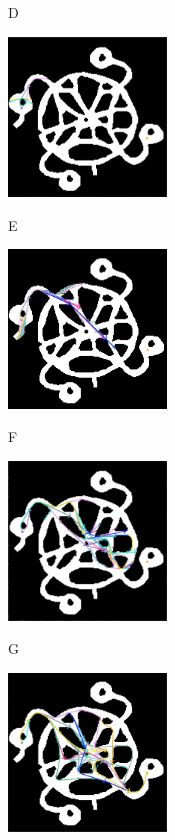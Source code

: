 \documentclass[letterpaper, 10 pt, journal, twoside]{IEEEtran}
\begin{document}
\begin{figure}[t]
\begin{minipage}{.23\linewidth}
  \centerline{D}
\end{minipage}
\vfill
\begin{minipage}{.23\linewidth}
  \centerline{\includegraphics[width=4.2cm, cframe=gray .2mm]{map4.png}}
  \centerline{E}
\end{minipage}
\hfill
\begin{minipage}{.23\linewidth}
  \centerline{\includegraphics[width=4.2cm, cframe=gray .2mm]{map5.png}}
  \centerline{F}
\end{minipage}
\hfill
\begin{minipage}{.23\linewidth}
  \centerline{\includegraphics[width=4.2cm, cframe=gray .2mm]{map6.png}}
  \centerline{G}
\end{minipage}
\hfill
\begin{minipage}{.23\linewidth}
  \centerline{\includegraphics[width=4.2cm, cframe=gray .2mm]{map7.png}}

\end{minipage}
\end{figure}
\end{document}
